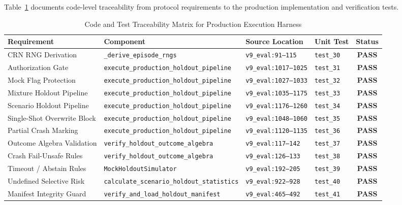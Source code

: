 \documentclass[10pt,a4paper]{article}
\begin{document}
Table~\ref{tab:traceability} documents code-level traceability from protocol requirements to the production implementation and verification tests.

\begin{table}[htbp]
\centering
\small
\caption{Code and Test Traceability Matrix for Production Execution Harness}
\label{tab:traceability}
\begin{tabularx}{\textwidth}{lp{4.0cm}Xlc}
\toprule
\textbf{Requirement} & \textbf{Component} & \textbf{Source Location} & \textbf{Unit Test} & \textbf{Status} \\
\midrule
CRN RNG Derivation & \texttt{\_derive\_episode\_rngs} & \texttt{v9\_eval:91--115} & \texttt{test\_30} & \textbf{PASS} \\
Authorization Gate & \texttt{execute\_production\_holdout\_pipeline} & \texttt{v9\_eval:1017--1025} & \texttt{test\_31} & \textbf{PASS} \\
Mock Flag Protection & \texttt{execute\_production\_holdout\_pipeline} & \texttt{v9\_eval:1027--1033} & \texttt{test\_32} & \textbf{PASS} \\
Mixture Holdout Pipeline & \texttt{execute\_production\_holdout\_pipeline} & \texttt{v9\_eval:1035--1175} & \texttt{test\_33} & \textbf{PASS} \\
Scenario Holdout Pipeline & \texttt{execute\_production\_holdout\_pipeline} & \texttt{v9\_eval:1176--1260} & \texttt{test\_34} & \textbf{PASS} \\
Single-Shot Overwrite Block & \texttt{execute\_production\_holdout\_pipeline} & \texttt{v9\_eval:1048--1060} & \texttt{test\_35} & \textbf{PASS} \\
Partial Crash Marking & \texttt{execute\_production\_holdout\_pipeline} & \texttt{v9\_eval:1120--1135} & \texttt{test\_36} & \textbf{PASS} \\
Outcome Algebra Validation & \texttt{verify\_holdout\_outcome\_algebra} & \texttt{v9\_eval:117--142} & \texttt{test\_37} & \textbf{PASS} \\
Crash Fail-Unsafe Rules & \texttt{verify\_holdout\_outcome\_algebra} & \texttt{v9\_eval:126--133} & \texttt{test\_38} & \textbf{PASS} \\
Timeout / Abstain Rules & \texttt{MockHoldoutSimulator} & \texttt{v9\_eval:192--205} & \texttt{test\_39} & \textbf{PASS} \\
Undefined Selective Risk & \texttt{calculate\_scenario\_holdout\_statistics} & \texttt{v9\_eval:922--928} & \texttt{test\_40} & \textbf{PASS} \\
Manifest Integrity Guard & \texttt{verify\_and\_load\_holdout\_manifest} & \texttt{v9\_eval:465--492} & \texttt{test\_41} & \textbf{PASS} \\

\end{tabularx}
\end{table}
\end{document}
